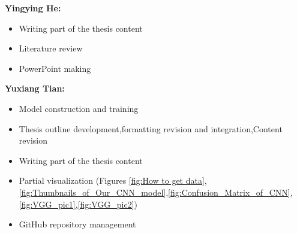 \documentclass{mcmthesis}
\begin{document}
\noindent \textbf{Yingying He:}
\begin{itemize}
    \item Writing part of the thesis content
    \item Literature review
    \item PowerPoint making
\end{itemize}
\noindent \textbf{Yuxiang Tian:}
\begin{itemize}
    \item Model construction and training
    \item Thesis outline development,formatting revision and integration,Content revision
    \item Writing part of the thesis content
    \item Partial visualization (Figures  \ref{fig:How to get data},\ref{fig:Thumbnails_of_Our_CNN_model},\ref{fig:Confusion_Matrix_of_CNN},\ref{fig:VGG_pic1},\ref{fig:VGG_pic2})
    \item GitHub repository management
\end{itemize}
\printbibliography %
\end{document}
